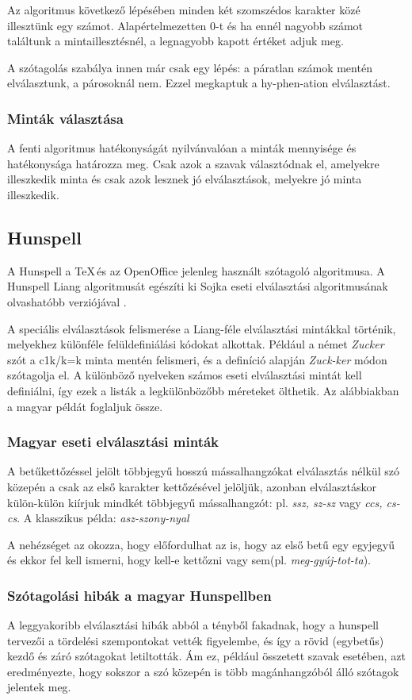 \documentclass[a4paper, magyar]{article}
\begin{document}
Az algoritmus következő lépésében minden két szomszédos karakter közé illesztünk egy számot. Alapértelmezetten $0$-t és ha ennél nagyobb számot találtunk a mintaillesztésnél, a legnagyobb kapott értéket adjuk meg.

A szótagolás szabálya innen már csak egy lépés: a páratlan számok mentén elválasztunk, a párosoknál nem. Ezzel megkaptuk a
{\selectfont
	hy-phen-ation%
}
elválasztást.
\subsubsection{Minták választása}
A fenti algoritmus hatékonyságát nyilvánvalóan a minták mennyisége és hatékonysága határozza meg. Csak azok a szavak választódnak el, amelyekre illeszkedik minta és csak azok lesznek jó elválasztások, melyekre jó minta illeszkedik.

\subsection{Hunspell}
A Hunspell a \TeX\,és az OpenOffice jelenleg használt szótagoló algoritmusa. A Hunspell Liang algoritmusát egészíti ki Sojka eseti elválasztási algoritmusának \cite{sojka1995notes} olvashatóbb verziójával \cite{nemeth2006automatic}.

A speciális elválasztások felismerése a Liang-féle elválasztási mintákkal történik, melyekhez különféle felüldefiniálási kódokat alkottak. Például a német \textit{Zucker} szót a
{\selectfont
	c1k/k=k%
} minta mentén felismeri, és a definíció alapján \textit{Zuck-ker} módon szótagolja el. A különböző nyelveken számos eseti elválasztási mintát kell definiálni, így ezek a listák a legkülönbözőbb méreteket ölthetik. Az alábbiakban a magyar példát foglaljuk össze.
\subsubsection{Magyar eseti elválasztási minták}
A betűkettőzéssel jelölt többjegyű hosszú mássalhangzókat elválasztás nélkül szó közepén a csak az első karakter kettőzésével jelöljük, azonban elválasztáskor külön-külön kiírjuk mindkét többjegyű mássalhangzót: pl. \textit{ssz, sz-sz} vagy \textit{ccs, cs-cs}. A klasszikus példa: \textit{asz-szony-nyal}

A nehézséget az okozza, hogy előfordulhat az is, hogy az első betű egy egyjegyű és ekkor fel kell ismerni, hogy kell-e kettőzni vagy sem(pl. \textit{meg-gyúj-tot-ta}).
\subsubsection{Szótagolási hibák a magyar Hunspellben}
A leggyakoribb elválasztási hibák abból a tényből fakadnak, hogy a hunspell tervezői a tördelési szempontokat vették figyelembe, és így a rövid (egybetűs) kezdő és záró szótagokat letiltották. Ám ez, például összetett szavak esetében, azt eredményezte, hogy sokszor a szó közepén is több magánhangzóból álló szótagok jelentek meg.
\end{document}
